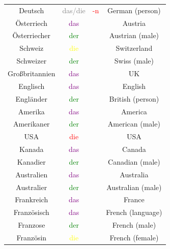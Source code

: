 \begin{center}
\begin{longtable} {|c|c|c|c|}
        Deutsch        & \textcolor{gray}{das/die} & \textcolor{red}{-n} & German (person)      \\
        Österriech     & \textcolor{purple}{das}   &                     & Austria              \\
        Österriecher   & \textcolor{green}{der}    &                     & Austrian (male)      \\
        Schweiz        & \textcolor{yellow}{die}   &                     & Switzerland          \\
        Schweizer      & \textcolor{green}{der}    &                     & Swiss (male)         \\
        \hline
        Großbritannien & \textcolor{purple}{das}   &                     & UK                   \\
        Englisch       & \textcolor{purple}{das}   &                     & English              \\
        Engländer      & \textcolor{green}{der}    &                     & British (person)     \\
        Amerika        & \textcolor{purple}{das}   &                     & America              \\
        Amerikaner     & \textcolor{green}{der}    &                     & American (male)      \\
        USA            & \textcolor{red}{die}      &                     & USA                  \\
        Kanada         & \textcolor{purple}{das}   &                     & Canada               \\
        Kanadier       & \textcolor{green}{der}    &                     & Canadian (male)      \\
        Australien     & \textcolor{purple}{das}   &                     & Australia            \\
        Australier     & \textcolor{green}{der}    &                     & Australian (male)    \\
        \hline
        Frankreich     & \textcolor{purple}{das}   &                     & France               \\
        Französisch    & \textcolor{purple}{das}   &                     & French (language)    \\
        Franzose       & \textcolor{green}{der}    &                     & French (male)        \\
        Französin      & \textcolor{yellow}{die}   &                     & French (female)      \\

\end{longtable}
\end{center}
